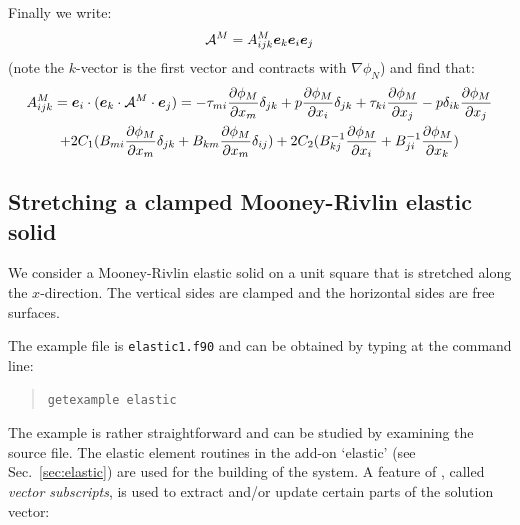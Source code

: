 Finally we write:
\[
    \mathcal{A}^M=A^M_{ijk}\boldsymbol{e}_k\boldsymbol{e}_i\boldsymbol{e}_j
\]
(note the $k$-vector is the first vector and contracts with $\nabla\phi_N$)
and find that:
\begin{multline*}
    A^M_{ijk}=\boldsymbol{e}_i\cdot(\boldsymbol{e}_k\cdot\mathcal{A}^M\cdot\boldsymbol{e}_j)=
  -\tau_{mi}\dfrac{\partial \phi_M}{\partial x_m}\delta_{jk}+p\dfrac{\partial \phi_M}{\partial x_i}\delta_{jk}
  +\tau_{ki}\dfrac{\partial \phi_M}{\partial x_j}-p\delta_{ik}\dfrac{\partial \phi_M}{\partial x_j}\\
  +2C_1(B_{mi}\dfrac{\partial \phi_M}{\partial x_m}\delta_{jk}+
        B_{km}\dfrac{\partial \phi_M}{\partial x_m}\delta_{ij})
  +2C_2(B^{-1}_{kj}\dfrac{\partial \phi_M}{\partial x_i}+
        B^{-1}_{ji}\dfrac{\partial \phi_M}{\partial x_k})
\end{multline*}

\subsection{Stretching a clamped Mooney-Rivlin elastic solid}
\label{sec:solidbar}

We consider a Mooney-Rivlin elastic solid on a unit square that is stretched
along the $x$-direction. The vertical sides are clamped and the horizontal
sides are free surfaces.

The example file is \texttt{elastic1.f90} and can be obtained by typing at the
command line:
\medskip
\begin{quote}
   \texttt{getexample elastic}
\end{quote}

The example is rather straightforward and can be studied by examining the
source file.
The elastic element routines
in the add-on `elastic' (see Sec.~\ref{sec:elastic}) are used for
the building of the system. 
A feature of \ftn, called \emph{vector subscripts},
is used to extract and/or update certain parts of the solution vector:


